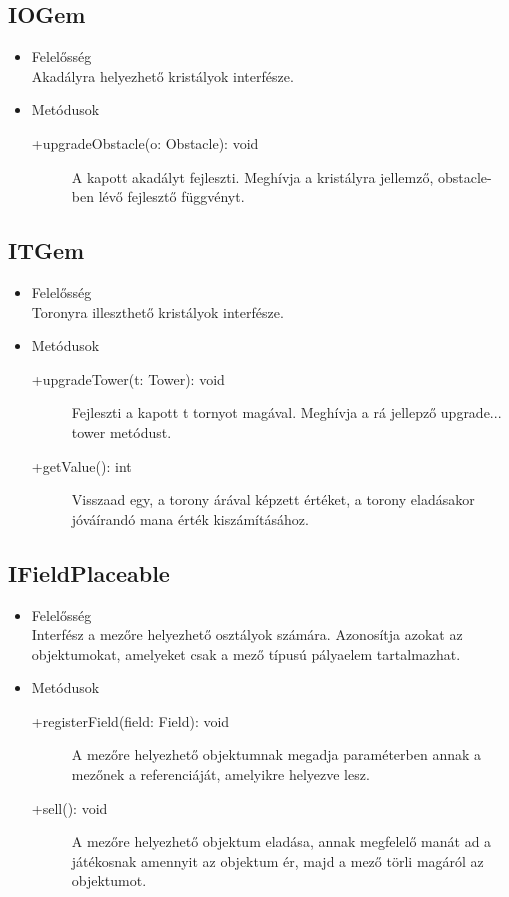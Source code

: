\subsection{IOGem}
\begin{itemize}
\item Felelősség\\
Akadályra helyezhető kristályok interfésze.

\item Metódusok\\
	\begin{description}
		\item[+upgradeObstacle(o: Obstacle): void] A kapott akadályt fejleszti. Meghívja a kristályra jellemző, obstacle-ben lévő fejlesztő függvényt. 
		
	\end{description}
\end{itemize}
\subsection{ITGem}
\begin{itemize}
\item Felelősség\\
Toronyra illeszthető kristályok interfésze.

\item Metódusok\\
	\begin{description}
		\item[+upgradeTower(t: Tower): void] Fejleszti a kapott t tornyot magával. Meghívja a rá jellepző upgrade...  tower metódust. 
\item[+getValue(): int] Visszaad egy, a torony árával képzett értéket, a torony eladásakor jóváírandó mana érték kiszámításához.

		
	\end{description}
\end{itemize}
\subsection{IFieldPlaceable}
\begin{itemize}
\item Felelősség\\
Interfész a mezőre helyezhető osztályok számára. Azonosítja azokat az objektumokat, amelyeket csak a mező típusú pályaelem tartalmazhat.

\item Metódusok\\
	\begin{description}
		\item[+registerField(field: Field): void] A mezőre helyezhető objektumnak megadja  paraméterben annak a mezőnek a referenciáját, amelyikre helyezve lesz. 
\item[+sell(): void] A mezőre helyezhető objektum eladása, annak megfelelő manát ad a játékosnak amennyit az objektum ér, majd a mező törli magáról az objektumot.

		
	\end{description}
\end{itemize}
